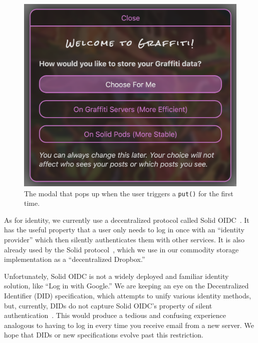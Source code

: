\begin{figure}[h]
    \includegraphics[width=\columnwidth]{figures/choose-protocol.png}
    \caption{The modal that pops up when the user triggers a \texttt{put()} for the first time.}
    \label{above-and-below:figure:choose-protocol}
\end{figure}

As for identity, we currently use a decentralized protocol called Solid OIDC~\cite{solidoidc}.
It has the useful property that a user only needs to log in once
with an ``identity provider'' which then silently authenticates
them with other services.
It is also already used by the Solid protocol~\cite{solid},
which we use in our commodity storage implementation as a ``decentralized Dropbox.''

Unfortunately, Solid OIDC is not a widely deployed and familiar identity solution,
like ``Log in with Google.''
We are keeping an eye on the Decentralized Identifier (DID) specification, which attempts to unify
various identity methods, but, currently, DIDs
do not capture Solid OIDC's property of silent authentication~\cite{dids}.
This would produce a tedious and confusing experience analogous to having to log in every time you receive email from a new server.
We hope that DIDs or new specifications evolve past this restriction.

